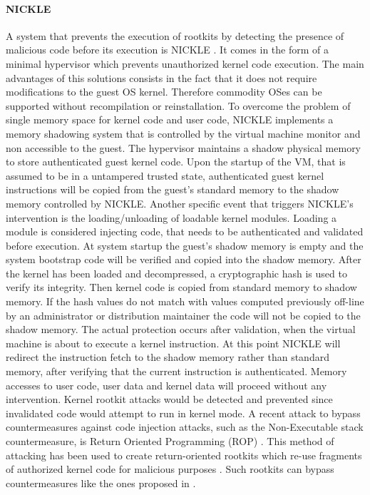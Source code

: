 \paragraph{NICKLE}
A system that prevents the execution of rootkits by detecting the presence of malicious code before its execution is NICKLE \cite{NICKLE}. It comes in the form of a minimal hypervisor which prevents unauthorized kernel code execution. The main advantages of this solutions consists in the fact that it does not require modifications to the guest OS kernel. Therefore commodity OSes can be supported without recompilation or reinstallation. 
To overcome the problem of single memory space for kernel code and user code, NICKLE implements a memory shadowing system that is controlled by the virtual machine monitor and non accessible to the guest. 
The hypervisor maintains a shadow physical memory to store authenticated guest kernel code. Upon the startup of the VM, that is assumed to be in a untampered trusted state, authenticated guest kernel instructions will be copied from the guest's standard memory to the shadow memory controlled by NICKLE. Another specific event that triggers NICKLE's intervention is the loading/unloading of loadable kernel modules. Loading a module is  considered injecting code, that needs to be authenticated and validated before execution. 
At system startup the guest's shadow memory is empty and the system bootstrap code will be verified and copied into the shadow memory. After the kernel has been loaded and decompressed, a cryptographic hash is used to verify its integrity. Then kernel code is copied from standard memory to shadow memory. If the hash values do not match with values computed previously off-line by an administrator or distribution maintainer the code will not be copied to the shadow memory.
The actual protection occurs after validation, when the virtual machine is about to execute a kernel instruction. At this point NICKLE will redirect the instruction fetch to the shadow memory rather than standard memory, after verifying that the current instruction is authenticated. 
Memory accesses to user code, user data and kernel data will proceed without any intervention. 
Kernel rootkit attacks would be detected and prevented since invalidated code would attempt to run in kernel mode.   
A recent attack to bypass countermeasures against code injection attacks, such as the Non-Executable stack countermeasure, is Return Oriented Programming (ROP) \cite{geometry}. This method of attacking has been used to create return-oriented rootkits which re-use fragments of authorized kernel code for malicious purposes \cite{Hund2009}. Such rootkits can bypass countermeasures like the ones proposed in \cite{NICKLE, SecVisor}.


